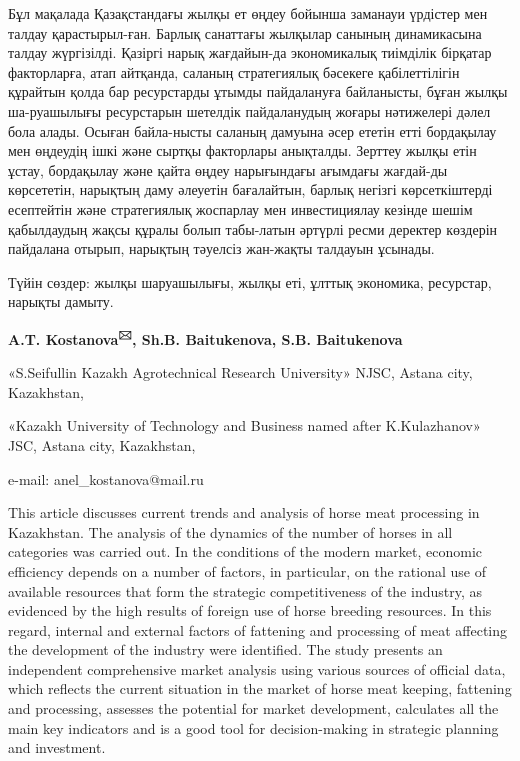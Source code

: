 Бұл мақалада Қазақстандағы жылқы ет өңдеу бойынша заманауи үрдістер мен
талдау қарастырыл-ған. Барлық санаттағы жылқылар санының динамикасына
талдау жүргізілді. Қазіргі нарық жағдайын-да экономикалық тиімділік
бірқатар факторларға, атап айтқанда, саланың стратегиялық бәсекеге
қабілеттілігін құрайтын қолда бар ресурстарды ұтымды пайдалануға
байланысты, бұған жылқы ша-руашылығы ресурстарын шетелдік пайдаланудың
жоғары нәтижелері дәлел бола алады. Осыған байла-нысты саланың дамуына
әсер ететін етті бордақылау мен өңдеудің ішкі және сыртқы факторлары
анықталды. Зерттеу жылқы етін ұстау, бордақылау және қайта өңдеу
нарығындағы ағымдағы жағдай-ды көрсететін, нарықтың даму әлеуетін
бағалайтын, барлық негізгі көрсеткіштерді есептейтін және стратегиялық
жоспарлау мен инвестициялау кезінде шешім қабылдаудың жақсы құралы болып
табы-латын әртүрлі ресми деректер көздерін пайдалана отырып, нарықтың
тәуелсіз жан-жақты талдауын ұсынады.

Түйін сөздер: жылқы шаруашылығы, жылқы еті, ұлттық экономика, ресурстар,
нарықты дамыту.

\begin{center}

{\bfseries A.T. Kostanova\textsuperscript{🖂}, Sh.B. Baitukenova, S.B.
Baitukenova}

«S.Seifullin Kazakh Agrotechnical Research University» NJSC, Astana city, Kazakhstan,

«Kazakh University of Technology and Business named after K.Kulazhanov» JSC, Astana city, Kazakhstan,

e-mail: anel\_kostanova@mail.ru
\end{center}

This article discusses current trends and analysis of horse meat
processing in Kazakhstan. The analysis of the dynamics of the number of
horses in all categories was carried out. In the conditions of the
modern market, economic efficiency depends on a number of factors, in
particular, on the rational use of available resources that form the
strategic competitiveness of the industry, as evidenced by the high
results of foreign use of horse breeding resources. In this regard,
internal and external factors of fattening and processing of meat
affecting the development of the industry were identified. The study
presents an independent comprehensive market analysis using various
sources of official data, which reflects the current situation in the
market of horse meat keeping, fattening and processing, assesses the
potential for market development, calculates all the main key indicators
and is a good tool for decision-making in strategic planning and
investment.

